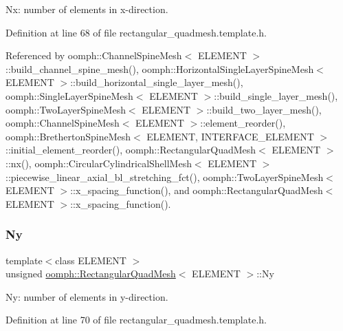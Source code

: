 Nx\+: number of elements in x-\/direction. 



Definition at line 68 of file rectangular\+\_\+quadmesh.\+template.\+h.



Referenced by oomph\+::\+Channel\+Spine\+Mesh$<$ E\+L\+E\+M\+E\+N\+T $>$\+::build\+\_\+channel\+\_\+spine\+\_\+mesh(), oomph\+::\+Horizontal\+Single\+Layer\+Spine\+Mesh$<$ E\+L\+E\+M\+E\+N\+T $>$\+::build\+\_\+horizontal\+\_\+single\+\_\+layer\+\_\+mesh(), oomph\+::\+Single\+Layer\+Spine\+Mesh$<$ E\+L\+E\+M\+E\+N\+T $>$\+::build\+\_\+single\+\_\+layer\+\_\+mesh(), oomph\+::\+Two\+Layer\+Spine\+Mesh$<$ E\+L\+E\+M\+E\+N\+T $>$\+::build\+\_\+two\+\_\+layer\+\_\+mesh(), oomph\+::\+Channel\+Spine\+Mesh$<$ E\+L\+E\+M\+E\+N\+T $>$\+::element\+\_\+reorder(), oomph\+::\+Bretherton\+Spine\+Mesh$<$ E\+L\+E\+M\+E\+N\+T, I\+N\+T\+E\+R\+F\+A\+C\+E\+\_\+\+E\+L\+E\+M\+E\+N\+T $>$\+::initial\+\_\+element\+\_\+reorder(), oomph\+::\+Rectangular\+Quad\+Mesh$<$ E\+L\+E\+M\+E\+N\+T $>$\+::nx(), oomph\+::\+Circular\+Cylindrical\+Shell\+Mesh$<$ E\+L\+E\+M\+E\+N\+T $>$\+::piecewise\+\_\+linear\+\_\+axial\+\_\+bl\+\_\+stretching\+\_\+fct(), oomph\+::\+Two\+Layer\+Spine\+Mesh$<$ E\+L\+E\+M\+E\+N\+T $>$\+::x\+\_\+spacing\+\_\+function(), and oomph\+::\+Rectangular\+Quad\+Mesh$<$ E\+L\+E\+M\+E\+N\+T $>$\+::x\+\_\+spacing\+\_\+function().

\mbox{\label{classoomph_1_1RectangularQuadMesh_a49a5ee7ef86ce837fb807eb6014a296d}} 
\subsubsection{\texorpdfstring{Ny}{Ny}}
{\footnotesize\ttfamily template$<$class E\+L\+E\+M\+E\+NT $>$ \\
unsigned \hyperlink{classoomph_1_1RectangularQuadMesh}{oomph\+::\+Rectangular\+Quad\+Mesh}$<$ E\+L\+E\+M\+E\+NT $>$\+::Ny\hspace{0.3cm}{\ttfamily [protected]}}



Ny\+: number of elements in y-\/direction. 



Definition at line 70 of file rectangular\+\_\+quadmesh.\+template.\+h.



